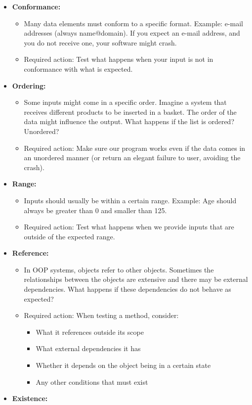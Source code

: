 \begin{itemize}
\tightlist
\item
  \textbf{Conformance:}

  \begin{itemize}
  \tightlist
  \item
    Many data elements must conform to a specific format. Example:
    e-mail addresses (always name@domain). If you expect an e-mail
    address, and you do not receive one, your software might crash.
  \item
    Required action: Test what happens when your input is not in
    conformance with what is expected.
  \end{itemize}
\item
  \textbf{Ordering:}

  \begin{itemize}
  \tightlist
  \item
    Some inputs might come in a specific order. Imagine a system that
    receives different products to be inserted in a basket. The order of
    the data might influence the output. What happens if the list is
    ordered? Unordered?
  \item
    Required action: Make sure our program works even if the data comes
    in an unordered manner (or return an elegant failure to user,
    avoiding the crash).
  \end{itemize}
\item
  \textbf{Range:}

  \begin{itemize}
  \tightlist
  \item
    Inputs should usually be within a certain range. Example: Age should
    always be greater than 0 and smaller than 125.
  \item
    Required action: Test what happens when we provide inputs that are
    outside of the expected range.
  \end{itemize}
\item
  \textbf{Reference:}

  \begin{itemize}
  \tightlist
  \item
    In OOP systems, objects refer to other objects. Sometimes the
    relationships between the objects are extensive and there may be
    external dependencies. What happens if these dependencies do not
    behave as expected?
  \item
    Required action: When testing a method, consider:

    \begin{itemize}
    \tightlist
    \item
      What it references outside its scope
    \item
      What external dependencies it has
    \item
      Whether it depends on the object being in a certain state
    \item
      Any other conditions that must exist
    \end{itemize}
  \end{itemize}
\item
  \textbf{Existence:}


\end{itemize}
